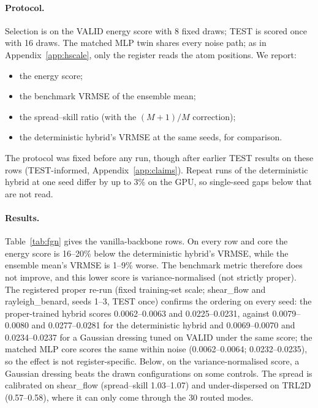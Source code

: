 \documentclass{article}
\begin{document}
\paragraph{Protocol.} Selection is on the VALID energy score with 8 fixed draws; TEST is scored once with 16 draws.
The matched MLP twin shares every noise path; as in Appendix~\ref{app:hscale}, only the register reads the atom
positions. We report:
\begin{itemize}
  \item the energy score;
  \item the benchmark VRMSE of the ensemble mean;
  \item the spread--skill ratio (with the $(M{+}1)/M$ correction);
  \item the deterministic hybrid's VRMSE at the same seeds, for comparison.
\end{itemize}
The protocol was fixed before any run, though after earlier TEST results on these rows (TEST-informed, Appendix~\ref{app:claims}). Repeat runs of the deterministic hybrid at one seed differ by up to 3\% on the
GPU, so single-seed gaps below that are not read.

\paragraph{Results.} Table~\ref{tab:fgn} gives the vanilla-backbone rows. On every row and core the energy score is
16--20\% below the deterministic hybrid's VRMSE, while the ensemble mean's VRMSE is 1--9\% worse. The benchmark metric
therefore does not improve, and this lower score is variance-normalised (not strictly proper). The registered proper re-run (fixed training-set scale; shear\_flow and rayleigh\_benard, seeds 1--3, TEST once) confirms the ordering on every seed: the proper-trained hybrid scores 0.0062--0.0063 and 0.0225--0.0231, against 0.0079--0.0080 and 0.0277--0.0281 for the deterministic hybrid and 0.0069--0.0070 and 0.0234--0.0237 for a Gaussian dressing tuned on VALID under the same score; the matched MLP core scores the same within noise (0.0062--0.0064; 0.0232--0.0235), so the effect is not register-specific. Below, on the variance-normalised score, a Gaussian dressing beats the drawn configurations on some controls. The spread is calibrated on shear\_flow (spread--skill 1.03--1.07)
and under-dispersed on TRL2D (0.57--0.58), where it can only come through the 30 routed modes.
\end{document}
